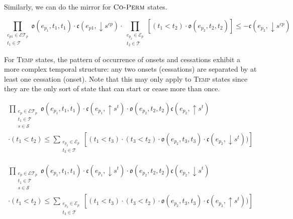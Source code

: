 Similarly, we can do the mirror for $\textsc{Co-Perm}$ states.

\begin{theorem}
	\begin{equation}
		\prod_{\substack{e_{p1} \in \mathcal{ET}_p \\ t_1 \in \mathcal{T}}} \mathfrak{o}(e_{p_1}, t_1, t_1) \cdot \mathfrak{c}(e_{p1}, \downarrow s^{cp}) \cdot
		\prod_{\substack{e_{p_2} \in \mathcal{E}_p \\ t_2 \in \mathcal{T}}}[(t_1 < t_2) \cdot \mathfrak{o}(e_{p_2}, t_2, t_2) ]
		\leq - \mathfrak{c}(e_{p_2}, \downarrow s^{cp})
	\end{equation}
\end{theorem}

For \textsc{Temp} states, the pattern of occurrence of onsets and cessations exhibit a more complex temporal
structure: any two onsets (cessations) are separated by at least one cessation (onset). Note that this
may only apply to \textsc{Temp} states since they are the only sort of state that can start or cease more
than once.

\begin{theorem}
	\begin{equation}
		\begin{gathered}
			\prod_{\substack{e_p \in \mathcal{ET}_p \\ t_1 \in \mathcal{T} \\ s \in \mathcal{S}}}\mathfrak{o}(e_{p_1}, t_1, t_1) \cdot \mathfrak{c}(e_{p_1}, \uparrow s^{t}) \cdot \mathfrak{o}(e_{p_2}, t_2, t_2) \mathfrak{c}(e_{p_2}, \uparrow s^{t}) \\
			\cdot (t_1 < t_2) \leq \sum_{\substack{e_{p_2} \in \mathcal{E}_p \\ t_3 \in \mathcal{T}}}[(t_1 < t_3) \cdot (t_3 < t_2) \cdot \mathfrak{o}(e_{p_2}, t_3, t_3)
				\cdot \mathfrak{c}(e_{p_2}, \downarrow s^{t}) )]
		\end{gathered}
	\end{equation}
\end{theorem}

\begin{theorem}
	\begin{equation}
		\begin{gathered}
			\prod_{\substack{e_p \in \mathcal{ET}_p \\ t_1 \in \mathcal{T} \\ s \in \mathcal{S}}}\mathfrak{o}(e_{p_1}, t_1, t_1) \cdot \mathfrak{c}(e_{p_1}, \downarrow s^{t}) \cdot
			\mathfrak{o}(e_{p_2}, t_2, t_2) \mathfrak{c}(e_{p_2}, \downarrow s^{t}) \\
			\cdot (t_1 < t_2) \leq \sum_{\substack{e_{p_2} \in \mathcal{E}_p \\ t_3 \in \mathcal{T}}}[(t_1 < t_3) \cdot (t_3 < t_2) \cdot \mathfrak{o}(e_{p_2}, t_3, t_3)
				\cdot \mathfrak{c}(e_{p_2}, \uparrow s^{t}) )]
		\end{gathered}
	\end{equation}
\end{theorem}

